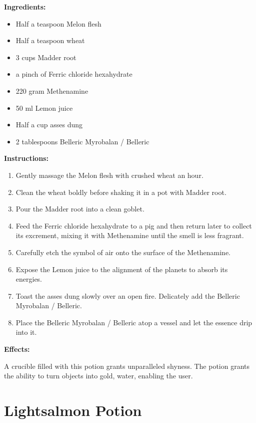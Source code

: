 \documentclass{article}
\begin{document}
\textbf{Ingredients:}

\begin{itemize}
  \item Half a teaspoon Melon flesh
  \item Half a teaspoon wheat
  \item 3 cups Madder root
  \item a pinch of Ferric chloride hexahydrate
  \item 220 gram Methenamine
  \item 50 ml Lemon juice
  \item Half a cup asses dung
  \item 2 tablespoons Belleric Myrobalan / Belleric
\end{itemize}

\textbf{Instructions:}

\begin{enumerate}
  \item Gently massage the Melon flesh with crushed wheat an hour.
  \item Clean the wheat boldly before shaking it in a pot with Madder root.
  \item Pour the Madder root into a clean goblet.
  \item Feed the Ferric chloride hexahydrate to a pig and then return later to collect its excrement, mixing it with Methenamine until the smell is less fragrant.
  \item Carefully etch the symbol of air onto the surface of the Methenamine.
  \item Expose the Lemon juice to the alignment of the planets to absorb its energies.
  \item Toast the asses dung slowly over an open fire. Delicately add the Belleric Myrobalan / Belleric.
  \item Place the Belleric Myrobalan / Belleric atop a vessel and let the essence drip into it.
\end{enumerate}

\textbf{Effects:}

A crucible filled with this potion grants unparalleled shyness. The potion grants the ability to turn objects into gold, water, enabling the user.

\newpage
\section*{Lightsalmon Potion}
\end{document}
